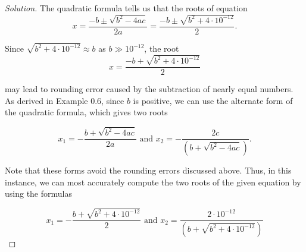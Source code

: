 \documentclass[11pt]{article}
\newenvironment{solution}
  {\renewcommand\qedsymbol{$\blacksquare$}\begin{proof}[Solution]}
  {\end{proof}}
\theoremstyle{definition}
\begin{document}
\begin{solution}
The quadratic formula tells us that the roots of equation \[ x = \frac{-b \pm \sqrt{b^2 -4ac}}{2a} = \frac{-b \pm \sqrt{b^2 + 4\cdot 10^{-12}}}{2}.\]

Since $\sqrt{b^2 + 4 \cdot 10^{-12}} \approx b$ as $b \gg 10^{-12}$, the root \[ x = \frac{-b + \sqrt{b^2 + 4\cdot10^{-12}}}{2} \]

may lead to rounding error caused by the subtraction of nearly equal numbers. \\

As derived in Example 0.6, since $b$ is positive, we can use the alternate form of the quadratic formula, which gives two roots

\[ x_1 = -\frac{b + \sqrt{b^2 - 4ac}}{2a} \text { and  } x_2 = -\frac{2c}{(b + \sqrt{b^2 - 4ac})}. \]

Note that these forms avoid the rounding errors discussed above. Thus, in this instance, we can most accurately compute the two roots of the given equation by using the formulas

\[ \boxed{ x_1 = -\frac{b + \sqrt{b^2 + 4\cdot10^{-12}}}{2} \text { and  } x_2 = \frac{2\cdot 10^{-12}}{(b + \sqrt{b^2 + 4\cdot10^{-12}})} } \]
\end{solution}
\end{document}
